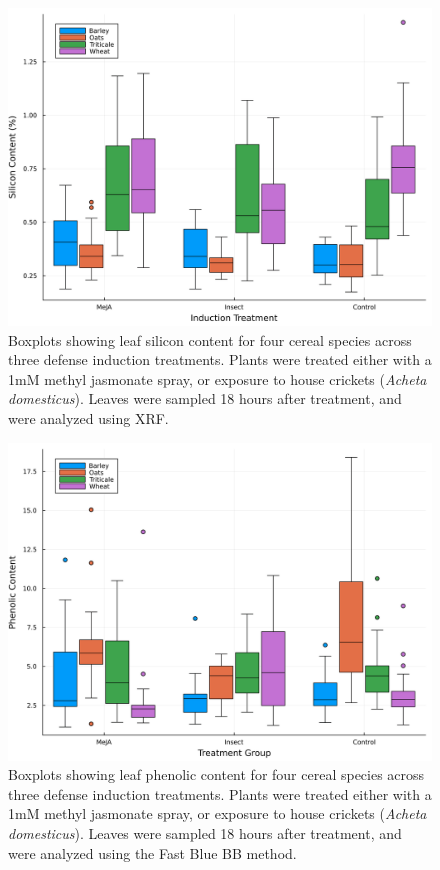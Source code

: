 \documentclass[12pt, letterpaper, ]{report}
\begin{document}
\begin{figure}[h]
        \includegraphics[width = \textwidth]{images/induction_plot.png}
        \centering
        \caption{Boxplots showing leaf silicon content for four cereal species across three defense induction treatments. Plants were treated either with a 1mM methyl jasmonate spray, or exposure to house crickets (\textit{Acheta domesticus}). Leaves were sampled 18 hours after treatment, and were analyzed using XRF.}
        \label{Fig:induction}
\end{figure}

\begin{figure}[h]
        \includegraphics[width = \textwidth]{images/absorbance_boxplots.png}
        \centering
        \caption{Boxplots showing leaf phenolic content for four cereal species across three defense induction treatments. Plants were treated either with a 1mM methyl jasmonate spray, or exposure to house crickets (\textit{Acheta domesticus}). Leaves were sampled 18 hours after treatment, and were analyzed using the Fast Blue BB method.}
        \label{Fig:absorbance_boxplots}
\end{figure}
\end{document}

